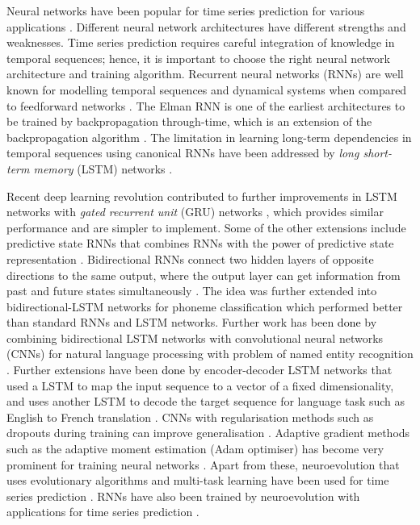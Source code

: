 \documentclass{ieeeaccess}
\begin{document}
Neural networks have been popular for time series prediction for various applications \cite{frank2001time}. Different neural network architectures have different strengths and weaknesses. Time series prediction requires careful integration of knowledge in temporal sequences; hence, it is important to choose the right neural network architecture and training algorithm. Recurrent neural networks (RNNs) are well known  for  modelling temporal sequences  \cite{elman_Zipser1988,Werbos_1990, connor1994recurrent,hochreiter1997long,schmidhuber2015deep} and  dynamical systems when compared to feedforward networks  \cite{Omlin_thonberetal1996, Omlin_Giles1992,Giles_etal1999}.    The Elman RNN   \cite{elman_Zipser1988,Elman_1990} is one of the earliest architectures to be  trained by backpropagation through-time, which is an extension of  the backpropagation algorithm   \cite{Werbos_1990}. The limitation  in   learning  long-term dependencies in temporal sequences  using canonical RNNs  \cite{hochreiter1998vanishing,bengio1994learning} have been addressed by  \textit{long short-term memory} (LSTM)  networks   \cite{hochreiter1997long}.

Recent  deep learning revolution \cite{schmidhuber2015deep} contributed to further improvements  in LSTM  networks with \textit{gated recurrent unit} (GRU)  networks \cite{chung2014empirical,cho2014learning}, which provides similar performance and are simpler to implement. Some of the other extensions include  predictive state  RNNs \cite{downey2017predictive} that combines RNNs with the  power  of predictive state representation  \cite{singh2004predictive}.  Bidirectional RNNs connect two hidden layers of opposite directions to the same output, where the output layer can get information from past   and future  states simultaneously \cite{schuster1997bidirectional}. The idea was further extended into bidirectional-LSTM networks for phoneme classification \cite{graves2005framewise} which performed better than standard RNNs and LSTM networks. Further work has been \textcolor{black}{done} by combining bidirectional LSTM networks with convolutional neural networks (CNNs) for natural language processing with problem of named entity recognition \cite{chiu2016named}. Further extensions have been \textcolor{black}{done} by encoder-decoder LSTM networks that used a LSTM to map the input sequence to a vector of a fixed dimensionality, and uses another LSTM to decode the target sequence for language task such as  English to French  translation  \cite{sutskever2014sequence}.  CNNs with  regularisation methods such as dropouts during training can  improve generalisation \cite{srivastava2014dropout}. Adaptive gradient methods such as the adaptive moment estimation (Adam optimiser) has become very prominent for training neural networks \cite{Adams2017}. Apart from these,  neuroevolution that uses evolutionary algorithms and multi-task learning have been used for time series prediction \cite{Chandra2018NC-CMTL,chandra2018co}.
 RNNs have also been trained by neuroevolution with applications for time series prediction \cite{cai2007time,chandra2012cooperative}.
\end{document}
